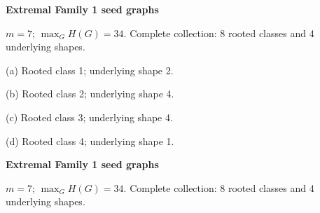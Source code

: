 \documentclass[10pt,a4paper]{article}
\begin{document}
{\Large\bfseries Extremal Family 1 seed graphs}\par\vspace{2mm}
{\small $m=7$; $\max_G H(G)=34$. Complete collection: 8 rooted classes and 4 underlying shapes.}\par
\vspace{1.5mm}{\small Root $0$: double circle. Port $0$: solid; port $1$: dashed. Members of each underlying shape share one vertex embedding.}\par\vspace{3mm}
\noindent\hfill
\begin{minipage}[t]{.47\textwidth}\centering
\resizebox{8.2cm}{!}{}\par\smallskip
{\small (a) Rooted class 1; underlying shape 2.}\par
\end{minipage}\hfill
\begin{minipage}[t]{.47\textwidth}\centering
\resizebox{8.2cm}{!}{}\par\smallskip
{\small (b) Rooted class 2; underlying shape 4.}\par
\end{minipage}\hfill
\par\vspace{3mm}
\noindent\hfill
\begin{minipage}[t]{.47\textwidth}\centering
\resizebox{8.2cm}{!}{}\par\smallskip
{\small (c) Rooted class 3; underlying shape 4.}\par
\end{minipage}\hfill
\begin{minipage}[t]{.47\textwidth}\centering
\resizebox{8.2cm}{!}{}\par\smallskip
{\small (d) Rooted class 4; underlying shape 1.}\par
\end{minipage}\hfill
\par\vspace{3mm}
\clearpage
{\Large\bfseries Extremal Family 1 seed graphs}\par\vspace{2mm}
{\small $m=7$; $\max_G H(G)=34$. Complete collection: 8 rooted classes and 4 underlying shapes.}\par
\vspace{1.5mm}{\small Root $0$: double circle. Port $0$: solid; port $1$: dashed. Members of each underlying shape share one vertex embedding.}\par\vspace{3mm}
\end{document}
